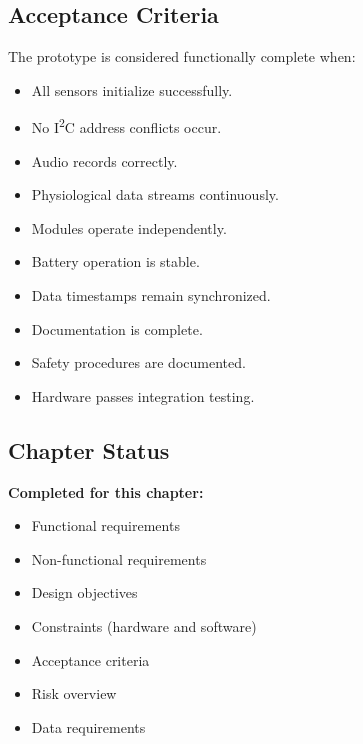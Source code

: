\subsection{Acceptance Criteria}
\label{sec:acceptance-criteria}

The prototype is considered functionally complete when:
\begin{itemize}
    \item All sensors initialize successfully.
    \item No I\textsuperscript{2}C address conflicts occur.
    \item Audio records correctly.
    \item Physiological data streams continuously.
    \item Modules operate independently.
    \item Battery operation is stable.
    \item Data timestamps remain synchronized.
    \item Documentation is complete.
    \item Safety procedures are documented.
    \item Hardware passes integration testing.
\end{itemize}

\subsection{Chapter Status}
\label{sec:ch2-status}

\begin{validationbox}
\textbf{Completed for this chapter:}
\begin{itemize}
    \item Functional requirements
    \item Non-functional requirements
    \item Design objectives
    \item Constraints (hardware and software)
    \item Acceptance criteria
    \item Risk overview
    \item Data requirements
\end{itemize}
\end{validationbox}
